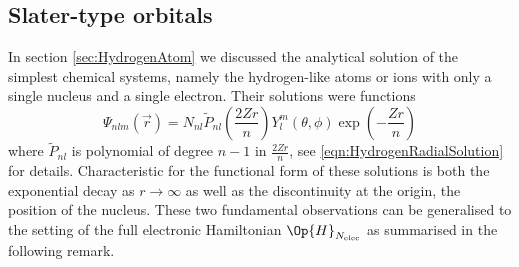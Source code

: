 \subsection{Slater-type orbitals}
\label{sec:STO}

In section \vref{sec:HydrogenAtom}
we discussed the analytical solution of the simplest chemical systems,
namely the hydrogen-like atoms or ions with only a single nucleus and a single electron.
Their solutions were functions
\[ \Psi_{nlm}(\vec{r}) = N_{nl} \tilde{P}_{nl}\left(\frac{2Zr}{n}\right)
	Y_l^m(\theta, \phi) \exp\left(-\frac{Zr}{n} \right) \]
where $\tilde{P}_{nl}$ is polynomial of degree $n-1$ in $\frac{2Zr}{n}$,
see \eqref{eqn:HydrogenRadialSolution} for details.
Characteristic for the functional form of these solutions
is both the exponential decay as $r \to \infty$ as well as
the discontinuity at the origin, \ie the position of the nucleus.
These two fundamental observations can be generalised to the setting of the
full electronic Hamiltonian $\Op{H}_{\Nelec}$ as summarised in the following remark.


